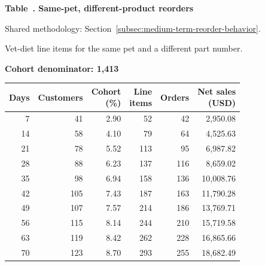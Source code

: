 \label{tab:financial-opportunity-new-chewy-same-pet-different-part}
\par\smallskip\noindent\parbox[t][2\baselineskip][t]{\linewidth}{\raggedright\textbf{Table~\thetable. Same-pet, different-product reorders}}
\par\raggedright\footnotesize Shared methodology: Section~\ref{subsec:medium-term-reorder-behavior}.
\par\noindent\parbox[t][2\baselineskip][t]{\linewidth}{\raggedright Vet-diet line items for the same pet and a different part number.}
\par\noindent\textbf{Cohort denominator: 1,413}
\par\centering\footnotesize
\setlength{\tabcolsep}{2pt}
\begin{tabular}{rrrrrr}\toprule
Days & Customers & \shortstack{Cohort\\(\%)} & \shortstack{Line\\items} & Orders & \shortstack{Net sales\\(USD)} \\ \midrule

7 & 41 & 2.90 & 52 & 42 & 2,950.08 \\

14 & 58 & 4.10 & 79 & 64 & 4,525.63 \\

21 & 78 & 5.52 & 113 & 95 & 6,987.82 \\

28 & 88 & 6.23 & 137 & 116 & 8,659.02 \\

35 & 98 & 6.94 & 158 & 136 & 10,008.76 \\

42 & 105 & 7.43 & 187 & 163 & 11,790.28 \\

49 & 107 & 7.57 & 214 & 186 & 13,769.71 \\

56 & 115 & 8.14 & 244 & 210 & 15,719.58 \\

63 & 119 & 8.42 & 262 & 228 & 16,865.66 \\

70 & 123 & 8.70 & 293 & 255 & 18,682.49 \\
\bottomrule\end{tabular}\par

